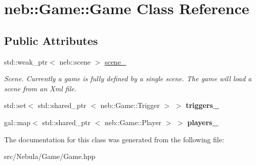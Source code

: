 \hypertarget{classneb_1_1Game_1_1Game}{\section{neb\-:\-:\-Game\-:\-:\-Game \-Class \-Reference}
\label{classneb_1_1Game_1_1Game}
}
\subsection*{\-Public \-Attributes}
\begin{DoxyCompactItemize}
\item 
\hypertarget{classneb_1_1Game_1_1Game_a4f7b6920d5e227713f4fbdac1463cc4a}{std\-::weak\-\_\-ptr$<$ neb\-::scene $>$ \hyperlink{classneb_1_1Game_1_1Game_a4f7b6920d5e227713f4fbdac1463cc4a}{scene\-\_\-}}\label{classneb_1_1Game_1_1Game_a4f7b6920d5e227713f4fbdac1463cc4a}

\begin{DoxyCompactList}\small\item\em \-Scene. \-Currently a game is fully defined by a single scene. \-The game will load a scene from an \-Xml file. \end{DoxyCompactList}\item 
\hypertarget{classneb_1_1Game_1_1Game_aed3384ec204c8b37ac2a2d28f76bc1cd}{std\-::set$<$ std\-::shared\-\_\-ptr\*
$<$ neb\-::\-Game\-::\-Trigger $>$ $>$ {\bfseries triggers\-\_\-}}\label{classneb_1_1Game_1_1Game_aed3384ec204c8b37ac2a2d28f76bc1cd}

\item 
\hypertarget{classneb_1_1Game_1_1Game_a2612d65f68620e6576906ac64609ad5d}{gal\-::map$<$ std\-::shared\-\_\-ptr\*
$<$ neb\-::\-Game\-::\-Player $>$ $>$ {\bfseries players\-\_\-}}\label{classneb_1_1Game_1_1Game_a2612d65f68620e6576906ac64609ad5d}

\end{DoxyCompactItemize}


\-The documentation for this class was generated from the following file\-:\begin{DoxyCompactItemize}
\item 
src/\-Nebula/\-Game/\-Game.\-hpp\end{DoxyCompactItemize}

